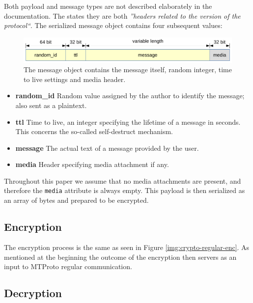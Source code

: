 \documentclass[thesis=M,english]{FITthesis}[2012/10/20]
\begin{document}
Both payload and message types are not described elaborately in the documentation. The \cite{telegram-aarhus} states they are both \emph{''headers related to the version of the protocol``}. The serialized message object contains four subsequent values:

\begin{figure}[htb]
	\centering
	\includegraphics[width=1\textwidth]{decrypted-message.pdf}
	\caption[Message object]{The message object contains the message itself, random integer, time to live settings and media header.}
	\label{img:crypto-secret-messageobject}
\end{figure}

\begin{itemize}
	\item \textbf{random\_id} Random value assigned by the author to identify the message; also sent as a plaintext.
	\item  \textbf{ttl} Time to live, an integer specifying the lifetime of a message in seconds. This concerns the so-called self-destruct mechanism.
	\item \textbf{message} The actual text of a message provided by the user.
	\item \textbf{media} Header specifying media attachment if any.
\end{itemize}

Throughout this paper we assume that no media attachments are present, and therefore the \texttt{media} attribute is always empty. This payload is then serialized as an array of bytes and prepared to be encrypted.

\subsection{Encryption}\label{crypto-secret-enc}

The encryption process is the same as seen in Figure \ref{img:crypto-regular-enc}. As mentioned at the beginning the outcome of the encryption then servers as an input to MTProto regular communication.

\subsection{Decryption}\label{crypto-secret-dec}
\end{document}
